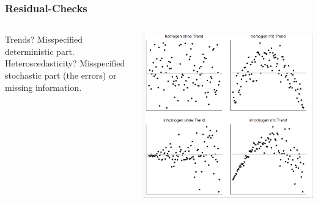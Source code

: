 \documentclass{beamer}
\begin{document}
\begin{frame}
    \frametitle{Residual-Checks}

    \begin{columns}
        \begin{column}{0.5\textwidth}
        Trends? Misspecified deterministic part. Heteroscedasticity? Misspecified stochastic part (the errors) or missing information.    
        \end{column}
        \begin{column}{0.5\textwidth}
            \includegraphics[width=\textwidth]{lectures/day_2_LM_refresh_I/figures/residuals.png}    
        \end{column}
    \end{columns}

\end{frame}
\end{document}
